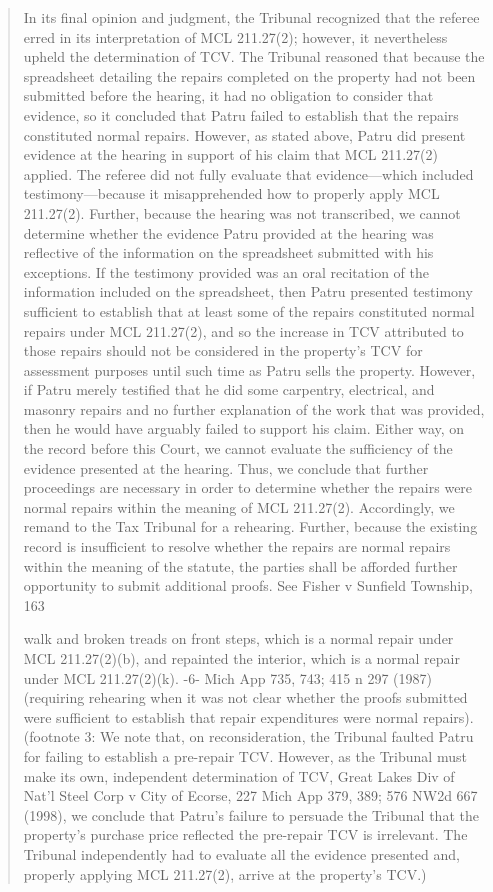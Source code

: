 \documentclass[12pt,\documentclassflag]{michiganCourtOfAppealsBrief}
\begin{document}
\begin{quotation}
  In its final opinion and judgment, the Tribunal recognized that the referee erred in its
interpretation of MCL 211.27(2); however, it nevertheless upheld the determination of TCV.
The Tribunal reasoned that because the spreadsheet detailing the repairs completed on the
property had not been submitted before the hearing, it had no obligation to consider that
evidence, so it concluded that Patru failed to establish that the repairs constituted normal repairs.
However, as stated above, Patru did present evidence at the hearing in support of his claim that
MCL 211.27(2) applied. The referee did not fully evaluate that evidence---which included
testimony---because it misapprehended how to properly apply MCL 211.27(2).
Further, because the hearing was not transcribed, we cannot determine whether the
evidence Patru provided at the hearing was reflective of the information on the spreadsheet
submitted with his exceptions. If the testimony provided was an oral recitation of the
information included on the spreadsheet, then Patru presented testimony sufficient to establish
that at least some of the repairs constituted normal repairs under MCL 211.27(2), and so the
increase in TCV attributed to those repairs should not be considered in the property's TCV for
assessment purposes until such time as Patru sells the property. However, if Patru merely
testified that he did some carpentry, electrical, and masonry repairs and no further explanation of
the work that was provided, then he would have arguably failed to support his claim. Either way,
on the record before this Court, we cannot evaluate the sufficiency of the evidence presented at
the hearing. Thus, we conclude that further proceedings are necessary in order to determine
whether the repairs were normal repairs within the meaning of MCL 211.27(2). Accordingly, we
remand to the Tax Tribunal for a rehearing. Further, because the existing record is insufficient to
resolve whether the repairs are normal repairs within the meaning of the statute, the parties shall
be afforded further opportunity to submit additional proofs. See Fisher v Sunfield Township, 163

walk and broken treads on front steps, which is a normal repair under MCL 211.27(2)(b), and
repainted the interior, which is a normal repair under MCL 211.27(2)(k).
-6-
Mich App 735, 743; 415 n 297 (1987) (requiring rehearing when it was not clear whether the
proofs submitted were sufficient to establish that repair expenditures were normal repairs).
(footnote 3: We note that, on reconsideration, the Tribunal faulted Patru for failing to establish a pre-repair
TCV. However, as the Tribunal must make its own, independent determination of TCV, Great
Lakes Div of Nat'l Steel Corp v City of Ecorse, 227 Mich App 379, 389; 576 NW2d 667 (1998),
we conclude that Patru's failure to persuade the Tribunal that the property's purchase price
reflected the pre-repair TCV is irrelevant. The Tribunal independently had to evaluate all the
evidence presented and, properly applying MCL 211.27(2), arrive at the property's TCV.)
\end{quotation}
\end{document}
